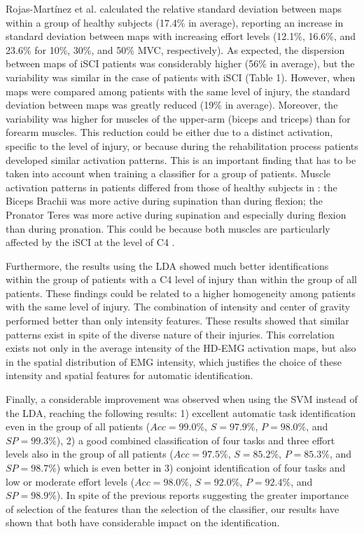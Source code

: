 Rojas-Martínez et al. \citep{RojasMartinez2012} calculated the relative standard deviation between maps within a group of healthy subjects (17.4\% in average), reporting an increase in standard deviation between maps with increasing effort levels (12.1\%, 16.6\%, and 23.6\% for 10\%, 30\%, and 50\% MVC, respectively). As expected, the dispersion between maps of iSCI patients was considerably higher (56\% in average), but the variability was similar in the case of patients with iSCI (Table 1). However, when maps were compared among patients with the same level of injury, the standard deviation between maps was greatly reduced (19\% in average). Moreover, the variability was higher for muscles of the upper-arm (biceps and triceps) than for forearm muscles. This reduction could be either due to a distinct activation, specific to the level of injury, or because during the rehabilitation process patients developed similar activation patterns. This is an important finding that has to be taken into account when training a classifier for a group of patients. Muscle activation patterns in patients differed from those of healthy subjects in \citep{Rojas-Martinez2012}: the Biceps Brachii was more active during supination than during flexion; the Pronator Teres was more active during supination and especially during flexion than during pronation. This could be because both muscles are particularly affected by the iSCI at the level of C4 \citep{Young-SCI}.

Furthermore, the results using the LDA showed much better identifications within the group of patients with a C4 level of injury than within the group of all patients. These findings could be related to a higher homogeneity among patients with the same level of injury. The combination of intensity and center of gravity performed better than only intensity features. These results showed that similar patterns exist in spite of the diverse nature of their injuries. This correlation exists not only in the average intensity of the HD-EMG activation maps, but also in the spatial distribution of EMG intensity, which justifies the choice of these intensity and spatial features for automatic identification.

Finally, a considerable improvement was observed when using the SVM instead of the LDA, reaching the following results: 1) excellent automatic task identification even in the group of all patients ($Acc=99.0\%$, $S=97.9\%$, $P=98.0\%$, and $SP=99.3\%$), 2) a good combined classification of four tasks and three effort levels also in the group of all patients ($Acc=97.5\%$, $S=85.2\%$, $P=85.3\%$, and $SP=98.7\%$) which is even better in 3) conjoint identification of four tasks and low or moderate effort levels ($Acc=98.0\%$, $S=92.0\%$, $P=92.4\%$, and $SP=98.9\%$). In spite of the previous reports suggesting the greater importance of selection of the features than the selection of the classifier, our results have shown that both have considerable impact on the identification.

